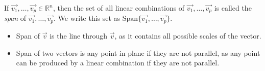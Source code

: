 \documentclass[11pt]{scrartcl}
\theoremstyle{dotlessP}
\theoremstyle{dotlessN}
\newcommand{\reals}{\mathbb{R}} %
\begin{document}
\begin{definition}
	[Span]
	If $\vec{v_1}, \dots, \vec{v_p} \in \reals^n$, then the set of all linear combinations of $\vec{v_1}, \dots, \vec{v_p}$ is called the \textit{span} of $\vec{v_1}, \dots, \vec{v_p}$. We write this set as $\text{Span}\{\vec{v_1}, \dots, \vec{v_p}\}$.
\end{definition}
\begin{itemize}
	\item Span of $\vec{v}$ is the line through $\vec{v}$, as it contains all possible scales of the vector.
	\item Span of two vectors is any point in plane if they are not parallel, as any point can be produced by a linear combination if they are not parallel.
\end{itemize}
\end{document}
